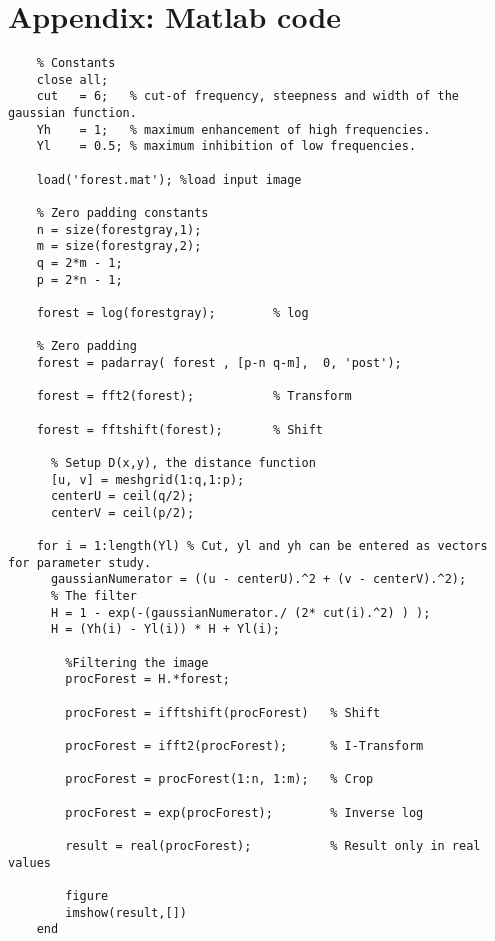 \section{Appendix: Matlab code}
  \begin{lstlisting}
    % Constants
    close all;
    cut   = 6;   % cut-of frequency, steepness and width of the gaussian function.
    Yh    = 1;   % maximum enhancement of high frequencies.
    Yl    = 0.5; % maximum inhibition of low frequencies.

    load('forest.mat'); %load input image

    % Zero padding constants
    n = size(forestgray,1);
    m = size(forestgray,2);
    q = 2*m - 1;
    p = 2*n - 1; 

    forest = log(forestgray);        % log

    % Zero padding
    forest = padarray( forest , [p-n q-m],  0, 'post'); 

    forest = fft2(forest);           % Transform

    forest = fftshift(forest);       % Shift
      
      % Setup D(x,y), the distance function
      [u, v] = meshgrid(1:q,1:p);
      centerU = ceil(q/2);
      centerV = ceil(p/2);

    for i = 1:length(Yl) % Cut, yl and yh can be entered as vectors for parameter study.
      gaussianNumerator = ((u - centerU).^2 + (v - centerV).^2);
      % The filter
      H = 1 - exp(-(gaussianNumerator./ (2* cut(i).^2) ) ); 
      H = (Yh(i) - Yl(i)) * H + Yl(i);
      
        %Filtering the image
        procForest = H.*forest;

        procForest = ifftshift(procForest)   % Shift
        
        procForest = ifft2(procForest);      % I-Transform
        
        procForest = procForest(1:n, 1:m);   % Crop
        
        procForest = exp(procForest);        % Inverse log

        result = real(procForest);           % Result only in real values

        figure
        imshow(result,[])
    end
  \end{lstlisting}
